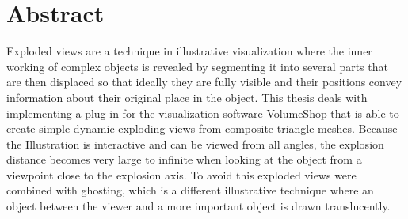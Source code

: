 %
%
%
%
%
%


\chapter*{Abstract}

Exploded views are a technique in illustrative visualization where the inner working of complex objects is revealed by segmenting it into several parts that are then displaced so that ideally they are fully visible and their positions convey information about their original place in the object. This thesis deals with implementing a plug-in for the visualization software VolumeShop that is able to create simple dynamic exploding views from composite triangle meshes. Because the Illustration is interactive and can be viewed from all angles, the explosion distance becomes very large to infinite when looking at the object from a viewpoint close to the explosion axis.  To avoid this exploded views were combined with ghosting, which is a different illustrative technique where an object between the viewer and a more important object is drawn translucently.